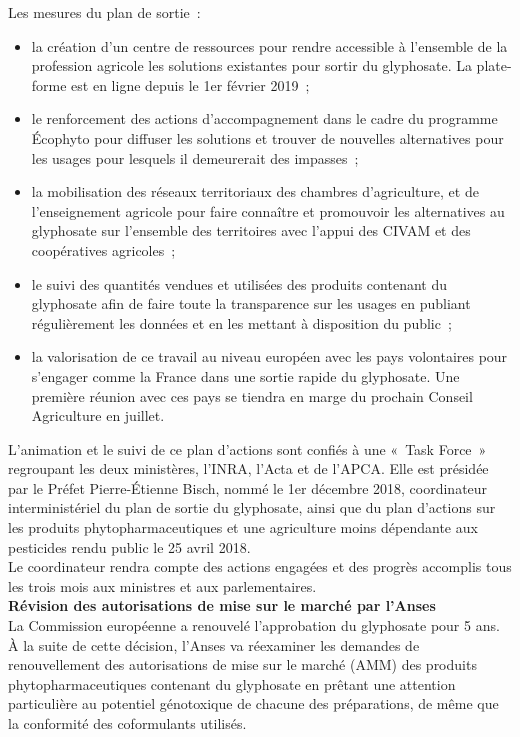 \documentclass[8pt]{article}
\begin{document}
Les mesures du plan de sortie~:
\begin{itemize}
	\setlength\itemsep{-0.25em}
	\item la création d’un centre de ressources pour rendre accessible à l’ensemble de la profession agricole les solutions existantes pour sortir du glyphosate. La plate-forme est en ligne depuis le 1er février 2019~;
	\item le renforcement des actions d’accompagnement dans le cadre du programme Écophyto pour diffuser les solutions et trouver de nouvelles alternatives pour les usages pour lesquels il demeurerait des impasses~;
	\item la mobilisation des réseaux territoriaux des chambres d’agriculture, et de l’enseignement agricole pour faire connaître et promouvoir les alternatives au glyphosate sur l’ensemble des territoires avec l’appui des CIVAM et des coopératives agricoles~;
	\item le suivi des quantités vendues et utilisées des produits contenant du glyphosate afin de faire toute la transparence sur les usages en publiant régulièrement les données et en les mettant à disposition du public~;
	\item la valorisation de ce travail au niveau européen avec les pays volontaires pour s’engager comme la France dans une sortie rapide du glyphosate. Une première réunion avec ces pays se tiendra en marge du prochain Conseil Agriculture en juillet.
\end{itemize}

L’animation et le suivi de ce plan d’actions sont confiés à une  «~Task Force~» regroupant les deux ministères, l’INRA, l’Acta et de l’APCA. Elle est présidée par le Préfet Pierre-Étienne Bisch, nommé le 1er décembre 2018, coordinateur interministériel du plan de sortie du glyphosate, ainsi que du plan d'actions sur les produits phytopharmaceutiques et une  agriculture moins dépendante aux pesticides rendu public le 25 avril 2018.\\

Le coordinateur rendra compte des actions engagées et des progrès accomplis tous les trois mois aux ministres et aux parlementaires.\\


\textbf{Révision des autorisations de mise sur le marché par l'Anses}\\

La Commission européenne a renouvelé l'approbation du glyphosate pour 5 ans. À la suite de cette décision, l'Anses va réexaminer les demandes de renouvellement des autorisations de mise sur le marché (AMM) des produits phytopharmaceutiques contenant du glyphosate en prêtant une attention particulière au potentiel génotoxique de chacune des préparations, de même que la conformité des coformulants utilisés.
\end{document}
